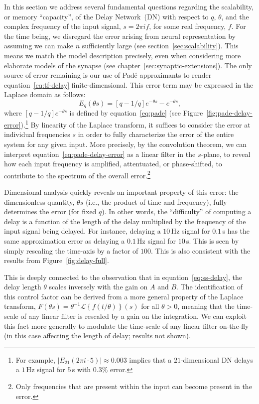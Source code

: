 In this section we address several fundamental questions regarding the scalability, or memory ``capacity'', of the Delay Network~(DN) with respect to $q$, $\theta$, and the complex frequency of the input signal, $s = 2 \pi i f$, for some real frequency, $f$.
For the time being, we disregard the error arising from neural representation by assuming we can make $n$ sufficiently large (see section~\ref{sec:scalability}).
This means we match the model description precisely, even when considering more elaborate models of the synapse (see chapter~\ref{sec:synaptic-extensions}).
The only source of error remaining is our use of Pad\'e approximants to render equation~\ref{eq:tf-delay} finite-dimensional.
This error term may be expressed in the Laplace domain as follows:
\begin{equation} \label{eq:pade-delay-error}
E_q(\theta s) = [q-1/q]e^{-\theta s} - e^{-\theta s} \text{,}
\end{equation}
where $[q-1/q]e^{-\theta s}$ is defined by equation~\ref{eq:pade} (see Figure~\ref{fig:pade-delay-error}).\footnote{%
For example, $|E_{21}(2 \pi i \cdot 5)| \approx 0.003$ implies that a $21$-dimensional DN delays a $1$\,Hz signal for $5$\,s with $0.3\%$ error.}
By linearity of the Laplace transform, it suffices to consider the error at individual frequencies $s$ in order to fully characterize the error of the entire system for any given input.
More precisely, by the convolution theorem, we can interpret equation~\ref{eq:pade-delay-error} as a linear filter in the $s$-plane, to reveal how each input frequency is amplified, attentuated, or phase-shifted, to contribute to the spectrum of the overall error.\footnote{%
Only frequencies that are present within the input can become present in the error.}

Dimensional analysis quickly reveals an important property of this error: the dimensionless quantity, $\theta s$ (i.e., the product of time and frequency), fully determines the error (for fixed $q$).
In other words, the ``difficulty'' of computing a delay is a function of the length of the delay multiplied by the frequency of the input signal being delayed.
For instance, delaying a $10$\,Hz signal for $0.1$\,s has the same approximation error as delaying a $0.1$\,Hz signal for $10$\,s.
This is seen by simply rescaling the time-axis by a factor of $100$.
This is also consistent with the results from Figure~\ref{fig:delay-full}.

This is deeply connected to the observation that in equation~\ref{eq:ss-delay}, the delay length $\theta$ scales inversely with the gain on $A$ and $B$.
The identification of this control factor can be derived from a more general property of the Laplace transform, $F \left( \theta s \right) = \theta^{-1} \mathcal{L} \left\{ f \left( t / \theta \right) \right\} (s)$ for all $\theta > 0$, meaning that the time-scale of any linear filter is rescaled by a gain on the integration.
We can exploit this fact more generally to modulate the time-scale of any linear filter on-the-fly (in this case affecting the length of delay; results not shown).

